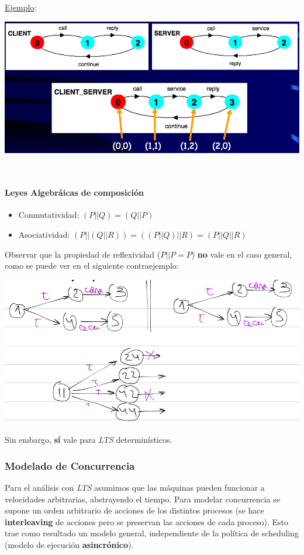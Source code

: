 \documentclass[]{article}
\begin{document}
\underline{Ejemplo}:

\begin{center}
	\includegraphics[scale=0.4]{ComParal.png}
\end{center}

~\newline

\paragraph{Leyes Algebráicas de composición}
\begin{itemize}
	\item Conmutatividad: $(P||Q) = (Q||P)$
	\item Asociatividad: $(P||(Q||R)) = ((P||Q)||R) = (P||Q||R)$
\end{itemize}

Observar que la propiedad de reflexividad ($P||P = P$) \textbf{no} vale en el caso general, como se puede ver en el siguiente contraejemplo:
\begin{center}
	\includegraphics[scale=0.5]{Contraejemplo.png}
\end{center}

Sin embargo, \textbf{sí} vale para \textit{LTS} determinísticos.

\subsubsection{Modelado de Concurrencia}
Para el análisis con \textit{LTS} asumimos que las máquinas pueden funcionar a velocidades arbitrarias, abstrayendo el tiempo. Para modelar concurrencia se supone un orden arbitrario de acciones de los distintos procesos (se hace \textbf{interleaving} de acciones pero se preservan las acciones de cada proceso). Esto trae como resultado un modelo general, independiente de la política de scheduling (modelo de ejecución \textbf{asincrónico}).
\end{document}
